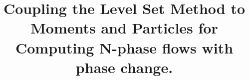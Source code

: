 \documentclass[preprint,12pt]{Definitions/elsarticle}
\begin{document}
\begin{frontmatter}



\title{Coupling the Level Set Method to Moments and Particles for Computing N-phase flows with phase change.}


\author{} %



\end{frontmatter}
\end{document}
